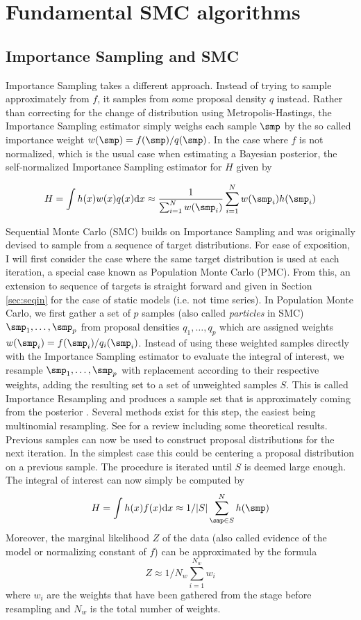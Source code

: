 \section{Fundamental SMC algorithms}

\subsection{Importance Sampling and SMC}
\label{sec:ismc}
Importance Sampling takes a different approach. Instead of trying to sample approximately from $f$, it samples from some proposal density $q$ instead. Rather than correcting for the change of distribution using Metropolis-Hastings, the Importance Sampling estimator simply weighs each sample $\smp$ by the so called importance weight $w(\smp) = f(\smp)/q(\smp)$. In the case where $f$ is not normalized, which is the usual case when estimating a Bayesian posterior, the self-normalized Importance Sampling estimator for $H$ given by

 $$H = \int h(x) w(x) q(x) \textrm{d}x \approx \frac{1}{\sum_{i=1}^N w(\smp_i)} \sum_{i=1}^N w(\smp_i) h(\smp_i)$$
 
Sequential Monte Carlo (SMC) \cite{Doucet2001a}  builds on Importance Sampling and was originally devised to sample from a sequence of target distributions. For ease of exposition, I will first consider the case where the same target distribution is used at each iteration, a special case known as Population Monte Carlo (PMC). From this, an extension to  sequence of targets is straight forward and given in Section \ref{sec:seqin} for the case of static models (i.e. not time series).
In Population Monte Carlo, we first gather a set of $p$ samples (also called \emph{particles} in SMC) $\smp_1,\dots,\smp_p$ from proposal densities $q_1,\dots,q_p$ which are assigned weights $w(\smp_i)=f(\smp_i)/q_i(\smp_i)$. Instead of using these weighted samples directly with the Importance Sampling estimator to evaluate the integral of interest, we resample  $\smp_1,\dots,\smp_p$ with replacement according to their respective weights, adding the resulting set to a set of unweighted samples $S$. This is called Importance Resampling and produces a sample set that is approximately coming from the posterior \citep{Rubin1987}. Several methods exist for this step, the easiest being multinomial resampling. See \cite{Douc2005} for a review including some theoretical results. 
Previous samples can now be used to construct proposal distributions for the next iteration.
In the simplest case this could be centering a proposal distribution on a previous sample. The procedure is iterated until $S$ is deemed large enough. The integral of interest can now simply be computed by
$$H = \int h(x) f(x) \textrm{d}x \approx 1/|S| \sum_{\smp \in S}^Nh(\smp)$$
Moreover, the marginal likelihood $Z$ of the data (also called evidence of the model or normalizing constant of $f$) can be approximated by the formula
$$Z \approx 1/N_w \sum_{i=1}^{N_w} w_i$$
where $w_i$ are the weights that have been gathered from the stage before resampling and $N_w$ is the total number of weights.

